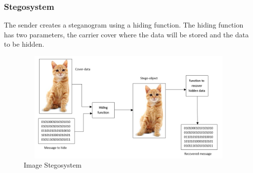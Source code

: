 \documentclass[12pt,hyperref={unicode}]{beamer}
\begin{document}


\begin{frame}
\frametitle{Stegosystem}
The sender creates a steganogram using a hiding function. The hiding function has two parameters, the carrier cover where the data will be stored and the data to be hidden.\pause
\begin{figure}[H]
\includegraphics[width=11.5cm, height=5.5cm]{stego2.png}
\centering
\caption{Image Stegosystem}
\end{figure}
\end{frame}

\end{document}
